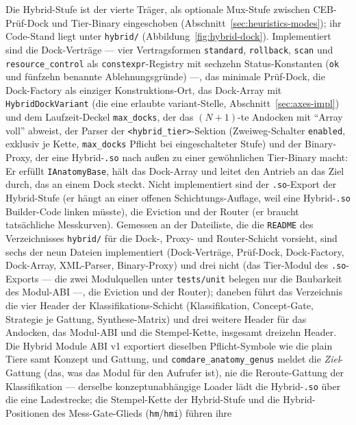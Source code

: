 \begin{nurlang}
Die Hybrid-Stufe ist der vierte Träger, als optionale Mux-Stufe zwischen CEB-Prüf-Dock und Tier-Binary
eingeschoben (Abschnitt~\ref{sec:heuristics-modes}); ihr Code-Stand liegt
unter \texttt{hybrid/} (Abbildung~\ref{fig:hybrid-dock}). Implementiert sind die Dock-Verträge --- vier
Vertragsformen \texttt{standard}, \texttt{rollback}, \texttt{scan} und \texttt{resource\_control} als
\texttt{constexpr}-Registry mit sechzehn Status-Konstanten (\texttt{ok} und fünfzehn benannte
Ablehnungsgründe) ---, das minimale Prüf-Dock, die Dock-Factory als einziger Konstruktions-Ort, das
Dock-Array mit \texttt{HybridDockVariant} (die eine erlaubte variant-Stelle,
Abschnitt~\ref{sec:axes-impl}) und dem Laufzeit-Deckel \texttt{max\_docks}, der das $(N+1)$-te Andocken
mit \enquote{Array voll} abweist, der Parser der \texttt{<hybrid\_tier>}-Sektion (Zweiweg-Schalter
\texttt{enabled}, exklusiv je Kette, \texttt{max\_docks} Pflicht bei eingeschalteter Stufe) und der
Binary-Proxy, der eine Hybrid-\texttt{.so} nach außen zu einer gewöhnlichen Tier-Binary macht: Er erfüllt
\texttt{IAnatomyBase}, hält das Dock-Array und leitet den Antrieb an das Ziel durch, das an einem Dock
steckt. Nicht implementiert sind der \texttt{.so}-Export der Hybrid-Stufe (er hängt an einer offenen
Schichtungs-Auflage, weil eine Hybrid-\texttt{.so} Builder-Code linken müsste), die Eviction und der Router (er
braucht tatsächliche Messkurven). Gemessen an der Dateiliste, die die \texttt{README} des Verzeichnisses
\texttt{hybrid/} für die Dock-, Proxy- und Router-Schicht vorsieht, sind sechs der neun Dateien implementiert
(Dock-Verträge, Prüf-Dock, Dock-Factory, Dock-Array, XML-Parser, Binary-Proxy) und drei nicht (das Tier-Modul
des \texttt{.so}-Exports --- die zwei Modulquellen unter \texttt{tests/unit} belegen nur die Baubarkeit des
Modul-ABI ---, die Eviction und der Router); daneben führt das Verzeichnis die vier Header der
Klassifikations-Schicht (Klassifikation, Concept-Gate, Strategie je Gattung, Synthese-Matrix) und drei weitere
Header für das Andocken, das Modul-ABI und die Stempel-Kette, insgesamt dreizehn Header.
Die Hybrid Module ABI v1 exportiert dieselben Pflicht-Symbole wie die plain
Tiere samt Konzept und Gattung, und \texttt{comdare\_anatomy\_genus} meldet die \emph{Ziel}-Gattung (das, was
das Modul für den Aufrufer ist), nie die Reroute-Gattung der Klassifikation --- derselbe
konzeptunabhängige Loader lädt die Hybrid-\texttt{.so} über die eine Ladestrecke; die Stempel-Kette der
Hybrid-Stufe und die Hybrid-Positionen des Mess-Gate-Glieds (\texttt{hm}/\texttt{hmi}) führen ihre

\end{nurlang}
